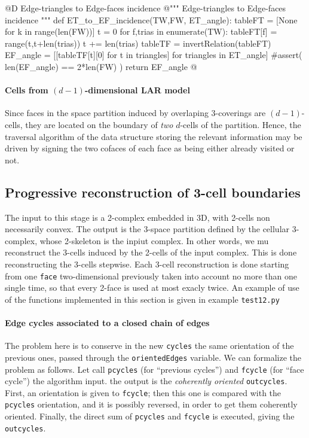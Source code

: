 \documentclass[11pt,oneside]{article}    %
\begin{document}
@D Edge-triangles to Edge-faces incidence
@{""" Edge-triangles to Edge-faces incidence """
def ET_to_EF_incidence(TW,FW, ET_angle):
    tableFT = [None for k in range(len(FW))]
    t = 0
    for f,trias in enumerate(TW):
        tableFT[f] = range(t,t+len(trias))
        t += len(trias)
    tableTF = invertRelation(tableFT)
    EF_angle = [[tableTF[t][0] for t in triangles] for triangles in ET_angle]
    #assert( len(EF_angle) == 2*len(FW) )
    return EF_angle
@}


\paragraph{Cells from $(d-1)$-dimensional LAR model}
Since faces in the space partition induced by overlaping 3-coverings are $(d-1)$-cells, they are located on the boundary of \emph{two} $d$-cells of the partition. Hence, the traversal algorithm of the data structure storing the relevant information may be driven by signing the two cofaces of each face as being either already visited or not.


\subsection{Progressive reconstruction of 3-cell boundaries}

The input to this stage is a 2-complex embedded in 3D, with 2-cells non necessarily convex. The output is the 3-space partition defined by the cellular 3-complex, whose 2-skeleton is the inpiut complex. In other words, we mu reconstruct the 3-cells induced by the 2-cells of the input complex. This is done reconstructing the 3-cells stepwise. Each 3-cell reconstruction is done starting from one \texttt{face} two-dimensional previously taken into account no more than one single time, so that every 2-face is used at most exacly twice. An example of use of the functions implemented in this section is given in example \texttt{test12.py}

\paragraph{Edge cycles associated to a closed chain of edges}

The problem here is to conserve in the new \texttt{cycles} the same orientation of the previous ones,
passed through the \texttt{orientedEdges} variable. We can formalize the problem as follows. Let call \texttt{pcycles} (for ``previous cycles'') and \texttt{fcycle} (for ``face cycle'') the algorithm input. the output is the \emph{coherently oriented} \texttt{outcycles}. First, an orientation is given to \texttt{fcycle}; then this one is compared with the \texttt{pcycles} orientation, and it is possibly reversed, in order to get them coherently oriented. Finally, the direct sum of \texttt{pcycles} and \texttt{fcycle} is executed, giving the \texttt{outcycles}.
\end{document}
